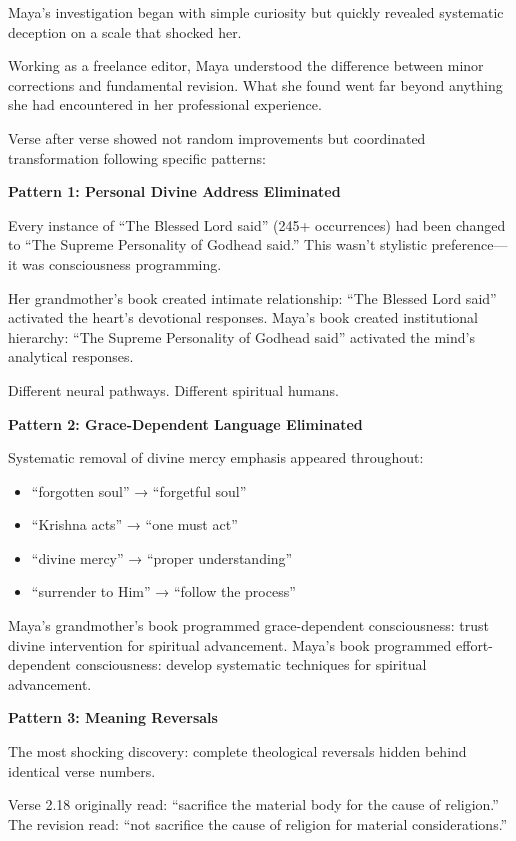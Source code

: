 \documentclass[11pt,twoside]{book}
\begin{document}
Maya's investigation began with simple curiosity but quickly revealed systematic deception on a scale that shocked her.

Working as a freelance editor, Maya understood the difference between minor corrections and fundamental revision. What she found went far beyond anything she had encountered in her professional experience.

Verse after verse showed not random improvements but coordinated transformation following specific patterns:

\textbf{Pattern 1: Personal Divine Address Eliminated}

Every instance of ``The Blessed Lord said'' (245+ occurrences) had been changed to ``The Supreme Personality of Godhead said.'' This wasn't stylistic preference—it was consciousness programming.

Her grandmother's book created intimate relationship: ``The Blessed Lord said'' activated the heart's devotional responses. Maya's book created institutional hierarchy: ``The Supreme Personality of Godhead said'' activated the mind's analytical responses.

Different neural pathways. Different spiritual humans.

\textbf{Pattern 2: Grace-Dependent Language Eliminated}

Systematic removal of divine mercy emphasis appeared throughout:
\begin{itemize}
\item ``forgotten soul'' → ``forgetful soul''
\item ``Krishna acts'' → ``one must act''
\item ``divine mercy'' → ``proper understanding''
\item ``surrender to Him'' → ``follow the process''
\end{itemize}

Maya's grandmother's book programmed grace-dependent consciousness: trust divine intervention for spiritual advancement. Maya's book programmed effort-dependent consciousness: develop systematic techniques for spiritual advancement.

\textbf{Pattern 3: Meaning Reversals}

The most shocking discovery: complete theological reversals hidden behind identical verse numbers.

Verse 2.18 originally read: ``sacrifice the material body for the cause of religion.''
The revision read: ``not sacrifice the cause of religion for material considerations.''
\end{document}
